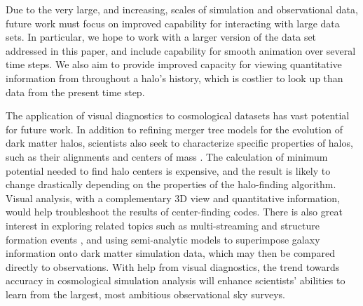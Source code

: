 Due to the very large, and increasing, scales of simulation and observational data, future work must focus on improved capability for interacting with large data sets. In particular, we hope to work with a larger version of the data set addressed in this paper, and include capability for smooth animation over several time steps. We also aim to provide improved capacity for viewing quantitative information from throughout a halo's history, which is costlier to look up than data from the present time step.

The application of visual diagnostics to cosmological datasets has vast potential for future work. In addition to refining merger tree models for the evolution of dark matter halos, scientists also seek to characterize specific properties of halos, such as their alignments and centers of mass \cite{Behroozi:2013}. The calculation of minimum potential needed to find halo centers is expensive, and the result is likely to change drastically depending on the properties of the halo-finding algorithm. Visual analysis, with a complementary 3D view and quantitative information, would help troubleshoot the results of center-finding codes. There is also great interest in exploring related topics such as multi-streaming and structure formation events \cite{Popov:2011}, and using semi-analytic models to superimpose galaxy information onto dark matter simulation data, which may then be compared directly to observations. With help from visual diagnostics, the trend towards accuracy in cosmological simulation analysis will enhance scientists' abilities to learn from the largest, most ambitious observational sky surveys.